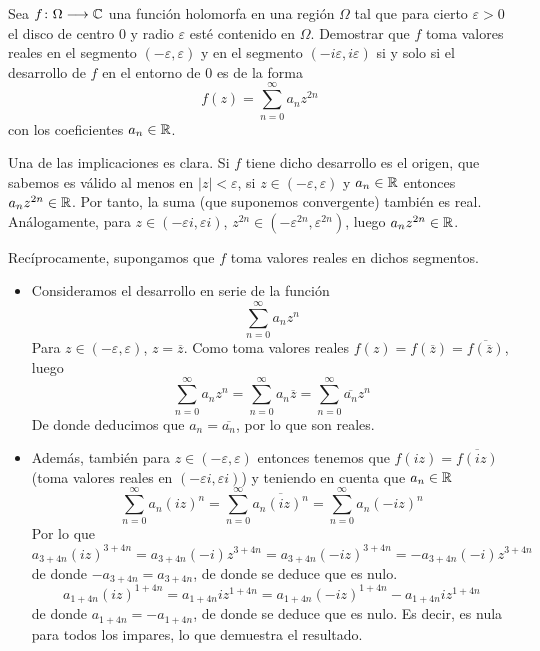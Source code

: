 \documentclass[twoside]{article}
\begin{document}
\begin{ejercicio}{6}
Sea $f\colon{\Omega}\longrightarrow{\mathbb{C}}$ una función holomorfa en una región $\Omega$ tal que para cierto $\varepsilon>0$ el disco de centro $0$ y radio $\varepsilon$ esté contenido en $\Omega$. Demostrar que $f$ toma valores reales en el segmento $(-\varepsilon,\varepsilon)$ y en el segmento $(-i\varepsilon,i\varepsilon)$ si y solo si el desarrollo de $f$ en el entorno de $0$ es de la forma
$$
f(z)=\sum_{n=0}^\infty a_nz^{2n}
$$
con los coeficientes $a_n \in \mathbb{R}$.
\end{ejercicio}
\begin{solucion}
Una de las implicaciones es clara. Si $f$ tiene dicho desarrollo es el origen, que sabemos es válido al menos en $|z|<\varepsilon$, si $z\in (-\varepsilon,\varepsilon)$ y $a_n\in \mathbb{R}$ entonces $a_nz^{2n} \in \mathbb{R}$. Por tanto, la suma (que suponemos convergente) también es real. Análogamente, para $z\in (-\varepsilon i,\varepsilon i)$, $z^{2n} \in (-\varepsilon^{2n},\varepsilon^{2n})$, luego $a_n z^{2n}\in \mathbb{R}$.

Recíprocamente, supongamos que $f$ toma valores reales en dichos segmentos. 
\begin{itemize}
\item Consideramos el desarrollo en serie de la función
$$\sum_{n=0}^\infty a_n z^n
$$
Para $z\in(-\varepsilon,\varepsilon)$, $z=\overline{z}$. Como toma valores reales $f(z)=f(\overline{z})=\overline{f(\overline{z})}$, luego
$$
\sum_{n=0}^\infty a_n z^n = \sum_{n=0}^\infty {a_n} \overline{z} = \sum_{n=0}^\infty \overline{a_n}z^n
$$
De donde deducimos que $a_n=\overline{a_n}$, por lo que son reales.
\item Además, también para $z\in (-\varepsilon,\varepsilon)$ entonces tenemos que $f(iz) = \overline{f(iz)}$ (toma valores reales en $(-\varepsilon i, \varepsilon i)$) y teniendo en cuenta que $a_n \in \mathbb{R}$
$$
\sum_{n=0}^\infty a_n (iz)^n = \sum_{n=0}^\infty {\overline{a_n ({iz})^n}} = \sum_{n=0}^\infty {a_n ({-iz})^n}  
$$
Por lo que 
$$
a_{3+4n} (iz)^{3+4n} = a_{3+4n}(-i)z^{3+4n} = a_{3+4n}(-iz)^{3+4n} = -a_{3+4n}(-i)z^{3+4n}
$$
de donde $-a_{3+4n}=a_{3+4n}$, de donde se deduce que es nulo.
$$
a_{1+4n} (iz)^{1+4n} = a_{1+4n}iz^{1+4n} = a_{1+4n}(-iz)^{1+4n} -a_{1+4n}iz^{1+4n}
$$
de donde $a_{1+4n}=-a_{1+4n}$, de donde se deduce que es nulo.  Es decir, es nula para todos los impares, lo que demuestra el resultado.
\end{itemize}
\end{solucion}
\newpage
\end{document}
